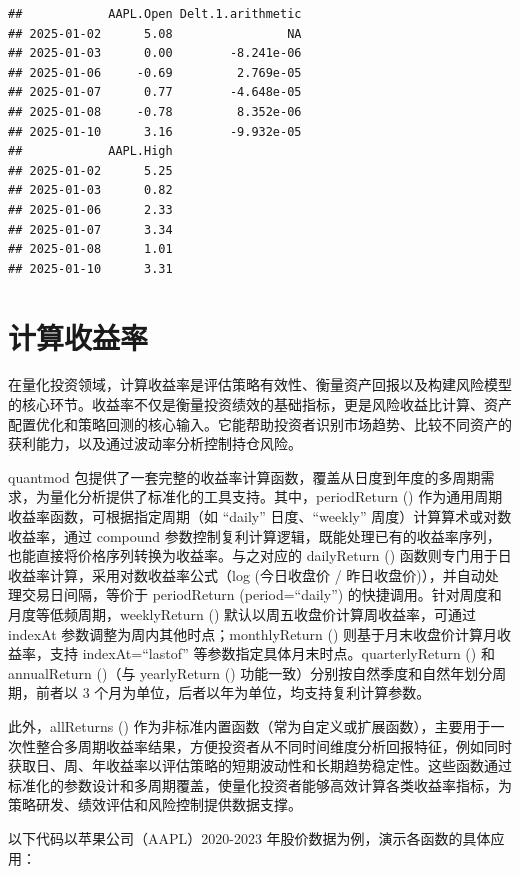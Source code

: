 \documentclass[]{ctexbook}
\begin{document}
\begin{verbatim}
##            AAPL.Open Delt.1.arithmetic
## 2025-01-02      5.08                NA
## 2025-01-03      0.00        -8.241e-06
## 2025-01-06     -0.69         2.769e-05
## 2025-01-07      0.77        -4.648e-05
## 2025-01-08     -0.78         8.352e-06
## 2025-01-10      3.16        -9.932e-05
##            AAPL.High
## 2025-01-02      5.25
## 2025-01-03      0.82
## 2025-01-06      2.33
## 2025-01-07      3.34
## 2025-01-08      1.01
## 2025-01-10      3.31
\end{verbatim}

\section{计算收益率}\label{ux8ba1ux7b97ux6536ux76caux7387}

在量化投资领域，计算收益率是评估策略有效性、衡量资产回报以及构建风险模型的核心环节。收益率不仅是衡量投资绩效的基础指标，更是风险收益比计算、资产配置优化和策略回测的核心输入。它能帮助投资者识别市场趋势、比较不同资产的获利能力，以及通过波动率分析控制持仓风险。

quantmod 包提供了一套完整的收益率计算函数，覆盖从日度到年度的多周期需求，为量化分析提供了标准化的工具支持。其中，periodReturn () 作为通用周期收益率函数，可根据指定周期（如 ``daily'' 日度、``weekly'' 周度）计算算术或对数收益率，通过 compound 参数控制复利计算逻辑，既能处理已有的收益率序列，也能直接将价格序列转换为收益率。与之对应的 dailyReturn () 函数则专门用于日收益率计算，采用对数收益率公式（log (今日收盘价 / 昨日收盘价)），并自动处理交易日间隔，等价于 periodReturn (period=``daily'') 的快捷调用。针对周度和月度等低频周期，weeklyReturn () 默认以周五收盘价计算周收益率，可通过 indexAt 参数调整为周内其他时点；monthlyReturn () 则基于月末收盘价计算月收益率，支持 indexAt=``lastof'' 等参数指定具体月末时点。quarterlyReturn () 和 annualReturn ()（与 yearlyReturn () 功能一致）分别按自然季度和自然年划分周期，前者以 3 个月为单位，后者以年为单位，均支持复利计算参数。

此外，allReturns () 作为非标准内置函数（常为自定义或扩展函数），主要用于一次性整合多周期收益率结果，方便投资者从不同时间维度分析回报特征，例如同时获取日、周、年收益率以评估策略的短期波动性和长期趋势稳定性。这些函数通过标准化的参数设计和多周期覆盖，使量化投资者能够高效计算各类收益率指标，为策略研发、绩效评估和风险控制提供数据支撑。

以下代码以苹果公司（AAPL）2020-2023 年股价数据为例，演示各函数的具体应用：
\end{document}

